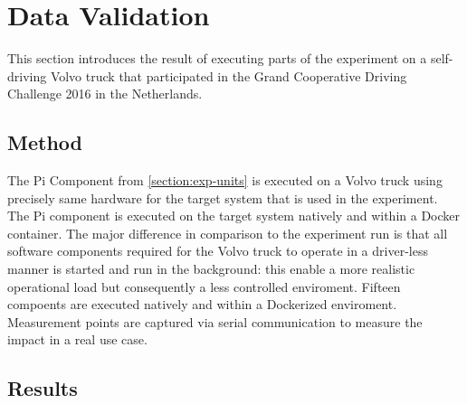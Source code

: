 \iffalse  \fi
\chapter{Data Validation}\label{section:data-validation}

This section introduces the result of executing parts of the experiment on a self-driving Volvo truck that participated in the Grand Cooperative Driving Challenge 2016 in the Netherlands. 

\section{Method}
The Pi Component from \ref{section:exp-units} is executed on a Volvo truck using precisely same hardware for the target system that is used in the experiment. The Pi component is executed on the target system natively and within a Docker container. The major difference in comparison to the experiment run is that all software components required for the Volvo truck to operate in a driver-less manner is started and run in the background: this enable a more realistic operational load but consequently a less controlled enviroment. Fifteen compoents are executed natively and within a Dockerized enviroment. Measurement points are captured via serial communication to measure the impact in a real use case. 

\section{Results}




